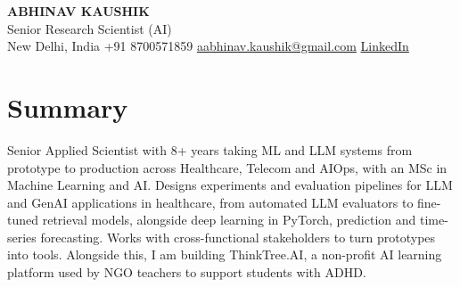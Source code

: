 \documentclass[10pt,a4paper]{article}
\begin{document}
\begin{center}
  {\LARGE\bfseries ABHINAV KAUSHIK}\\[2pt]
  {\large Senior Research Scientist (AI)}\\[2pt]
  New Delhi, India \textbar{} +91 8700571859 \textbar{} \href{mailto:aabhinav.kaushik@gmail.com}{aabhinav.kaushik@gmail.com} \textbar{} \href{https://www.linkedin.com/in/abhinav-kaushik10/}{LinkedIn}  
\end{center}

\section{Summary}
Senior Applied Scientist with 8+ years taking ML and LLM systems from prototype to production across Healthcare, Telecom and AIOps, with an MSc in Machine Learning and AI. Designs experiments and evaluation pipelines for LLM and GenAI applications in healthcare, from automated LLM evaluators to fine-tuned retrieval models, alongside deep learning in PyTorch, prediction and time-series forecasting. Works with cross-functional stakeholders to turn prototypes into tools. Alongside this, I am building ThinkTree.AI, a non-profit AI learning platform used by NGO teachers to support students with ADHD.
\end{document}
